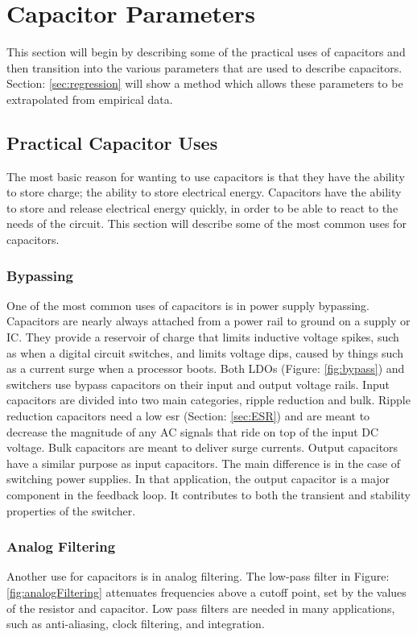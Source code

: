 \section {Capacitor Parameters}
\label{sec:params}

This section will begin by describing some of the practical uses of capacitors and then transition into the various parameters that are used to describe capacitors. Section: \ref{sec:regression} will show a method which allows these parameters to be extrapolated from empirical data.

\subsection{Practical Capacitor Uses}

The most basic reason for wanting to use capacitors is that they  have the ability to store charge; the ability to store electrical energy. Capacitors have the ability to store and release electrical energy quickly, in order to be able to react to the needs of the circuit. This section will describe some of the most common uses for capacitors.

\subsubsection{Bypassing}


One of the most common uses of capacitors is in power supply bypassing. Capacitors are nearly always attached from a power rail to ground on a supply or IC. They provide a reservoir of charge that limits inductive voltage spikes, such as when a digital circuit switches, and limits voltage dips, caused by things such as a current surge when a processor boots.
Both LDOs (Figure: \ref{fig:bypass}) and switchers use bypass capacitors on their input and output voltage rails. Input capacitors are divided into two main categories, ripple reduction and bulk. Ripple reduction capacitors need a low \gls{esr} (Section: \ref{sec:ESR}) and are meant to decrease the magnitude of any AC signals that ride on top of the input DC voltage. Bulk capacitors are meant to deliver surge currents. Output capacitors have a similar purpose as input capacitors. The main difference is in the case of switching power supplies. In that application, the output capacitor is a major component in the feedback loop. It contributes to both the transient and stability properties of the switcher.

\subsubsection{Analog Filtering}

Another use for capacitors is in analog filtering. The low-pass filter in Figure: \ref{fig:analogFiltering} attenuates frequencies above a cutoff point, set by the values of the resistor and capacitor. Low pass filters are needed in many applications, such as anti-aliasing, clock filtering, and integration.

